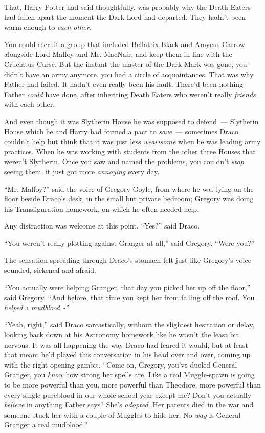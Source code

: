 That, Harry Potter had said thoughtfully, was probably why the Death Eaters had fallen apart the moment the Dark Lord had departed. They hadn't been warm enough to \emph{each other}.

You could recruit a group that included Bellatrix Black and Amycus Carrow alongside Lord Malfoy and Mr. MacNair, and keep them in line with the Cruciatus Curse. But the instant the master of the Dark Mark was gone, you didn't have an army anymore, you had a circle of acquaintances. That was why Father had failed. It hadn't even really been his fault. There'd been nothing Father \emph{could} have done, after inheriting Death Eaters who weren't really \emph{friends} with each other.

And even though it was Slytherin House he was supposed to defend~--- Slytherin House which he and Harry had formed a pact to \emph{save}~--- sometimes Draco couldn't help but think that it was just less \emph{wearisome} when he was leading army practices. When he was working with students from the other three Houses that weren't Slytherin. Once you saw and named the problems, you couldn't \emph{stop} seeing them, it just got more \emph{annoying} every day.

``Mr. Malfoy?'' said the voice of Gregory Goyle, from where he was lying on the floor beside Draco's desk, in the small but private bedroom; Gregory was doing his Transfiguration homework, on which he often needed help.

Any distraction was welcome at this point. ``Yes?'' said Draco.

``You weren't really plotting against Granger at all,'' said Gregory. ``Were you?''

The sensation spreading through Draco's stomach felt just like Gregory's voice sounded, sickened and afraid.

``You actually were helping Granger, that day you picked her up off the floor,'' said Gregory. ``And before, that time you kept her from falling off the roof. You \emph{helped} a \emph{mudblood}~-''

``Yeah, right,'' said Draco sarcastically, without the slightest hesitation or delay, looking back down at his Astronomy homework like he wasn't the least bit nervous. It was all happening the way Draco had feared it would, but at least that meant he'd played this conversation in his head over and over, coming up with the right opening gambit. ``Come on, Gregory, you've dueled General Granger, you \emph{know} how strong her spells are. Like a real Muggle-spawn is going to be more powerful than you, more powerful than Theodore, more powerful than every single pureblood in our whole school year except me? Don't you actually \emph{believe} in anything Father says? She's \emph{adopted.} Her parents died in the war and someone stuck her with a couple of Muggles to hide her. No \emph{way} is General Granger a real mudblood.''

